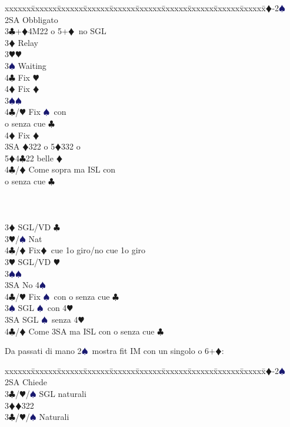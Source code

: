 \documentclass[a4paper,italian]{article}
\newcommand{\BC}{\textcolor{OliveGreen}{$\clubsuit$}}
\newcommand{\BD}{\textcolor{RedOrange}{$\vardiamondsuit$}}
\newcommand{\BH}{\textcolor{Red2}{$\varheartsuit${}}}
\newcommand{\BS}{\textcolor{MidnightBlue}{$\spadesuit${}}}
\newenvironment{bidtable}
{\begin{tabbing}

    xxxxxx\=xxxxxx\=xxxxxx\=xxxxxx\=xxxxxx\=xxxxxx\=xxxxxx\=xxxxxx\=xxxxxx\=xxxxxx\=\kill}
{\end{tabbing} }%
\begin{document}
\begin{multicols}{2}

    \begin{bidtable}
        1\BD-2\BS\+\\
        2SA \> Obbligato\+\\
        3\BC {}+\BD 4M22 o 5+\BD\ no SGL\+\\
        3\BD \> Relay\+\\
        3\BH {}\BH \+\\
        3\BS \> Waiting\\
        4\BC \> Fix \BH \\
        4\BD \> Fix \BD \-\\
        3\BS {}\BS \+\\
        4\BC/\BH \> Fix \BS\ con \+\\
        o senza cue \BC \-\\
        4\BD \> Fix \BD \-\\
        3SA \BD322 o 5\BD 332 o\+\\ 5\BD 4\BC 22 belle \BD\-\\
        4\BC/\BD \> Come sopra ma ISL con\+\\o senza cue \BC\-\-\-\\
        \\
        \\
        \\
        3\BD \> SGL/VD \BC \+\\
        3\BH/\BS \> Nat\\
        4\BC/\BD \> Fix\BD\ cue 1o giro/no cue 1o giro\-\\
        3\BH \> SGL/VD \BH \+\\
        3\BS {}\BS \+\\
        3SA \> No 4\BS \\
        4\BC/\BH \> Fix \BS\ con o senza cue \BC \-\-\\
        3\BS \> SGL \BS\ con 4\BH \\
        3SA \> SGL \BS\ senza 4\BH \\
        4\BC/\BD \> Come 3SA ma ISL con o senza cue \BC \\
    \end{bidtable}
    Da passati di mano 2\BS\ mostra fit IM con un singolo o 6+\BD:
    \begin{bidtable}
        1\BD-2\BS\+\\
        2SA \> Chiede\+\\
        3\BC/\BH/\BS \> SGL naturali\\
        3\BD {}\BD322\-\\
        3\BC/\BH/\BS \> Naturali\-\\
    \end{bidtable}
\end{multicols}
\end{document}
